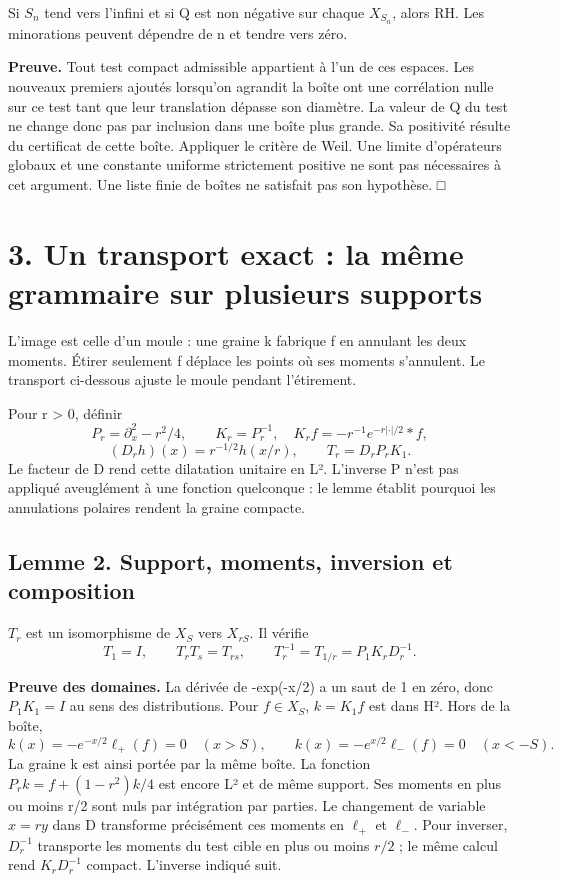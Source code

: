 \documentclass[
  10pt,
  a4paper,
]{article}
\begin{document}
Si \(S_n\) tend vers l'infini et si Q est non négative sur chaque
\(X_{S_n}\), alors RH. Les minorations peuvent dépendre de n et tendre
vers zéro.

\textbf{Preuve.} Tout test compact admissible appartient à l'un de ces
espaces. Les nouveaux premiers ajoutés lorsqu'on agrandit la boîte ont
une corrélation nulle sur ce test tant que leur translation dépasse son
diamètre. La valeur de Q du test ne change donc pas par inclusion dans
une boîte plus grande. Sa positivité résulte du certificat de cette
boîte. Appliquer le critère de Weil. Une limite d'opérateurs globaux et
une constante uniforme strictement positive ne sont pas nécessaires à
cet argument. Une liste finie de boîtes ne satisfait pas son hypothèse.
□

\hypertarget{un-transport-exact-la-muxeame-grammaire-sur-plusieurs-supports}{%
\section{3. Un transport exact : la même grammaire sur plusieurs
supports}\label{un-transport-exact-la-muxeame-grammaire-sur-plusieurs-supports}}

L'image est celle d'un moule : une graine k fabrique f en annulant les
deux moments. Étirer seulement f déplace les points où ses moments
s'annulent. Le transport ci-dessous ajuste le moule pendant l'étirement.

Pour r \textgreater{} 0, définir \[
P_r=\partial_x^2-r^2/4,\qquad
K_r=P_r^{-1},\quad K_r f=-r^{-1}e^{-r|\cdot|/2}*f,
\] \[
(D_rh)(x)=r^{-1/2}h(x/r),\qquad T_r=D_rP_rK_1.
\] Le facteur de D rend cette dilatation unitaire en L². L'inverse P
n'est pas appliqué aveuglément à une fonction quelconque : le lemme
établit pourquoi les annulations polaires rendent la graine compacte.

\hypertarget{lemme-2.-support-moments-inversion-et-composition}{%
\subsection{Lemme 2. Support, moments, inversion et
composition}\label{lemme-2.-support-moments-inversion-et-composition}}

\(T_r\) est un isomorphisme de \(X_S\) vers \(X_{rS}\). Il vérifie \[
T_1=I,\qquad T_rT_s=T_{rs},\qquad T_r^{-1}=T_{1/r}=P_1K_rD_r^{-1}.
\]

\textbf{Preuve des domaines.} La dérivée de -exp(-\textbar x\textbar/2)
a un saut de 1 en zéro, donc \(P_1K_1=I\) au sens des distributions.
Pour \(f\in X_S\), \(k=K_1f\) est dans H². Hors de la boîte, \[
k(x)=-e^{-x/2}\ell_+(f)=0\quad(x>S),\qquad
k(x)=-e^{x/2}\ell_-(f)=0\quad(x<-S).
\] La graine k est ainsi portée par la même boîte. La fonction
\(P_rk=f+(1-r^2)k/4\) est encore L² et de même support. Ses moments en
plus ou moins r/2 sont nuls par intégration par parties. Le changement
de variable \(x=ry\) dans D transforme précisément ces moments en
\(\ell_+\) et \(\ell_-\). Pour inverser, \(D_r^{-1}\) transporte les
moments du test cible en plus ou moins \(r/2\) ; le même calcul rend
\(K_rD_r^{-1}\) compact. L'inverse indiqué suit.
\end{document}
